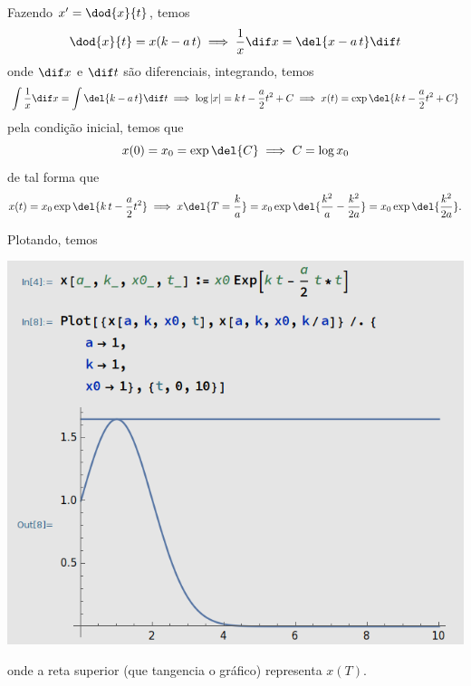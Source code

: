 \documentclass{IMTexam}
\begin{document}
\begin{questions}
\begin{parts}
            \begin{solution}
                Fazendo $x'=\dod{x}{t}$, temos
                \[ \dod{x}{t}=x(k-a\,t)\implies \dfrac{1}{x}\dif x=\del{x-a\,t}\dif t \]
                onde $\dif x$ e $\dif t$ são diferenciais, integrando, temos
                \[ \int\dfrac{1}{x}\dif x=\int\del{k-a\,t}\dif t\implies \log|x|=k\,t-\dfrac{a}{2}t^2+C\implies x(t)=\exp\del{k\,t-\dfrac{a}{2}t^2+C} \]
                pela condição inicial, temos que
                \[ x(0)=x_0=\exp\del{C}\implies C=\log x_0 \]
                de tal forma que
                \[ x(t)=x_0\exp\del{k\,t-\dfrac{a}{2}t^2}\implies x\del{T=\dfrac{k}{a}}=x_0\exp\del{\dfrac{k^2}{a}-\dfrac{k^2}{2a}}=x_0\exp\del{\dfrac{k^2}{2a}}. \]

                Plotando, temos

                \begin{center}
                    \includegraphics[width=0.8\linewidth]{2021-06-19-18-00-15.png}
                \end{center}

                onde a reta superior (que tangencia o gráfico) representa $x(T)$.

            \end{solution}
        \end{parts}


    \end{questions}
\end{document}
